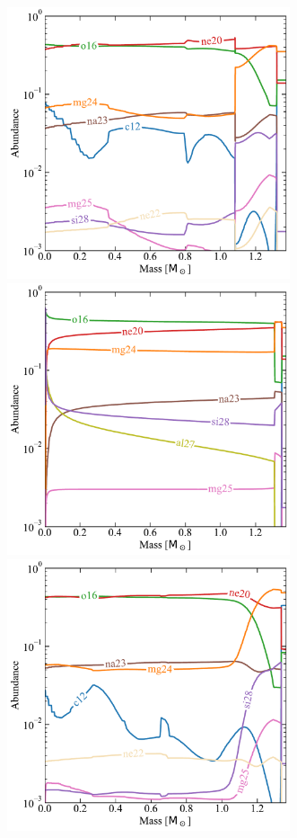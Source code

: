 \documentclass[main.tex]{subfiles}
\begin{document}
\begin{figure}[hbt!]
    \centering 
    \includegraphics[height=8cm]{figures/chapter2/abundances/2p1_eta1p58_Rho9.pdf}\quad
    \includegraphics[height=8cm]{figures/chapter2/abundances/2p1_eta1p58_final_abun.pdf}
    \includegraphics[height=8cm]{figures/chapter2/abundances/2p4_eta1p58_Rho9.pdf}\quad

\end{figure}
\end{document}
